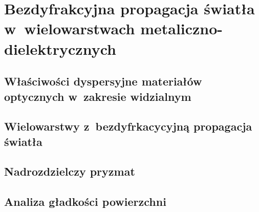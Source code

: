 \chapter{Bezdyfrakcyjna propagacja światła w~wielowarstwach metaliczno-dielektrycznych}
\label{art:nondiff}

\section{Właściwości dyspersyjne materiałów optycznych w~zakresie widzialnym}

\section{Wielowarstwy z~bezdyfrkacycyjną propagacja światła}

\section{Nadrozdzielczy pryzmat}


\section{Analiza gładkości powierzchni}



